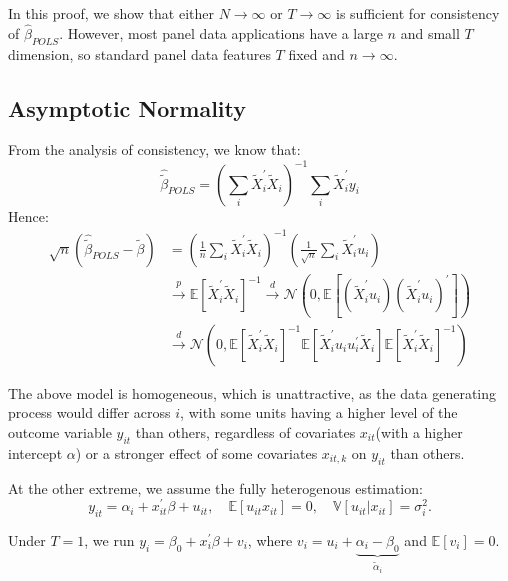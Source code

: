 In this proof, we show that either $N \to \infty $ or $T \to  \infty $ is sufficient for consistency of $\hat{\beta}_{POLS}$.
However, most panel data applications have a large $n$ and small $T$ dimension, so standard panel data
features $T$ fixed and $n \to \infty $.

\subsection{Asymptotic Normality}

From the analysis of consistency, we know that:
\[ 
\hat{\tilde{\beta}}_{POLS}  = \left(\sum_i \tilde{X}_i^{\prime} \tilde{X}_i \right)^{-1} \sum_i \tilde{X}_i^{\prime} y_i
\]
Hence:
\begin{align*}
    \sqrt{n} (\hat{\tilde{\beta}}_{POLS}  - \tilde{\beta}) &= \left(\frac{1}{n} \sum_i \tilde{X}_i^{\prime} \tilde{X}_i \right)^{-1} \left(\frac{1}{\sqrt{n} } \sum_i \tilde{X}_i^{\prime} u_i \right) \\
    & \overset{p}{\rightarrow}\mathbb{E}[\tilde{X}_i^{\prime} \tilde{X}_i]^{-1} \overset{d}{\rightarrow} \mathcal{N}\left(0, \mathbb{E}\left[\left(\tilde{X}_i^{\prime} u_i\right) \left(\tilde{X}_i^{\prime} u_i\right)^{\prime} \right] \right)\\
    & \overset{d}{\rightarrow} \mathcal{N} \left(0, \mathbb{E}\left[\tilde{X}_i^{\prime} \tilde{X}_i \right]^{-1} \mathbb{E}\left[\tilde{X}_i^{\prime} u_i u_i^{\prime} \tilde{X}_i \right] \mathbb{E}\left[\tilde{X}_i^{\prime} \tilde{X}_i \right]^{-1} \right)
\end{align*}


The above model is homogeneous, which is unattractive, as the data generating process would 
differ across $i$, with some units having a higher level of the outcome variable $y_{it} $
than others, regardless of covariates $x_{it}$(with a higher intercept $\alpha$) or a stronger effect
of some covariates $x_{it, k} $ on $y_{it}$ than others.

At the other extreme, we assume the fully heterogenous estimation:
\[y_{it} = \alpha_i + x_{it}^{\prime} \beta + u_{it}, \quad \mathbb{E}[u_{it} x_{it}] = 0, \quad \mathbb{V}[u_{it} | x_{it}] = \sigma_i^2. \]

Under $T=1$, we run $y_i = \beta_0 + x_i^{\prime} \beta + v_i$, 
where $v_i = u_i + \underset{\tilde{\alpha}_i}{\underbrace{\alpha_i - \beta_0}}$
and $\mathbb{E}[v_i] = 0$.

